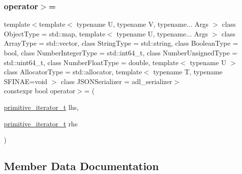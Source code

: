 \mbox{\label{classnlohmann_1_1basic__json_1_1primitive__iterator__t_aadc054c066f8d117695113ddceb8c46e}} 
\subsubsection{\texorpdfstring{operator$>$=}{operator>=}}
{\footnotesize\ttfamily template$<$template$<$ typename U, typename V, typename... Args $>$ class Object\+Type = std\+::map, template$<$ typename U, typename... Args $>$ class Array\+Type = std\+::vector, class String\+Type  = std\+::string, class Boolean\+Type  = bool, class Number\+Integer\+Type  = std\+::int64\+\_\+t, class Number\+Unsigned\+Type  = std\+::uint64\+\_\+t, class Number\+Float\+Type  = double, template$<$ typename U $>$ class Allocator\+Type = std\+::allocator, template$<$ typename T, typename S\+F\+I\+N\+A\+E=void $>$ class J\+S\+O\+N\+Serializer = adl\+\_\+serializer$>$ \\
constexpr bool operator$>$= (\begin{DoxyParamCaption}\item[{\hyperlink{classnlohmann_1_1basic__json_1_1primitive__iterator__t}{primitive\+\_\+iterator\+\_\+t}}]{lhs,  }\item[{\hyperlink{classnlohmann_1_1basic__json_1_1primitive__iterator__t}{primitive\+\_\+iterator\+\_\+t}}]{rhs }\end{DoxyParamCaption})\hspace{0.3cm}{\ttfamily [friend]}}



\subsection{Member Data Documentation}
\mbox{\label{classnlohmann_1_1basic__json_1_1primitive__iterator__t_ac6aac2e2de4c7e5a10694ff173ac5f31}} 
